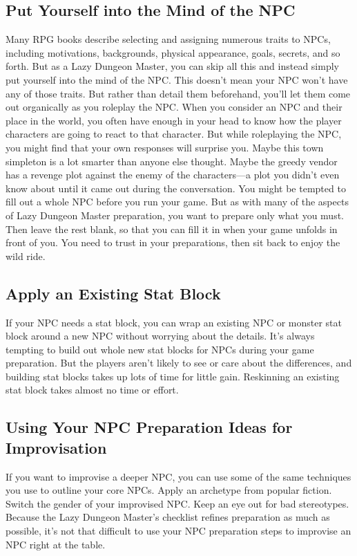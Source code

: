 \documentclass[10pt,a4paper,twoside,bg=print,twocolumn,openany,nodeprecatedcode]{dndbook}
\begin{document}
\subsection{Put Yourself into the Mind of the NPC}
Many RPG books describe selecting and assigning numerous traits to NPCs, including motivations, backgrounds, physical appearance, goals, secrets, and so forth. But as a Lazy Dungeon Master, you can skip all this and instead simply put yourself into the mind of the NPC. This doesn't mean your NPC won't have any of those traits. But rather than detail them beforehand, you'll let them come out organically as you roleplay the NPC.
When you consider an NPC and their place in the world, you often have enough in your head to know how the player characters are going to react to that character. But while roleplaying the NPC, you might find that your own responses will surprise you. Maybe this town simpleton is a lot smarter than anyone else thought. Maybe the greedy vendor has a revenge plot against the enemy of the characters—a plot you didn't even know about until it came out during the conversation.
You might be tempted to fill out a whole NPC before you run your game. But as with many of the aspects of Lazy Dungeon Master preparation, you want to prepare only what you must. Then leave the rest blank, so that you can fill it in when your game unfolds in front of you. You need to trust in your preparations, then sit back to enjoy the wild ride.
\subsection{Apply an Existing Stat Block}
If your NPC needs a stat block, you can wrap an existing NPC or monster stat block around a new NPC without worrying about the details. It's always tempting to build out whole new stat blocks for NPCs during your game preparation. But the players aren't likely to see or care about the differences, and building stat blocks takes up lots of time for little gain. Reskinning an existing stat block takes almost no time or effort.
\subsection{Using Your NPC Preparation Ideas for Improvisation}
If you want to improvise a deeper NPC, you can use some of the same techniques you use to outline your core NPCs. Apply an archetype from popular fiction. Switch the gender of your improvised NPC. Keep an eye out for bad stereotypes. Because the Lazy Dungeon Master's checklist refines preparation as much as possible, it's not that difficult to use your NPC preparation steps to improvise an NPC right at the table.
\end{document}
